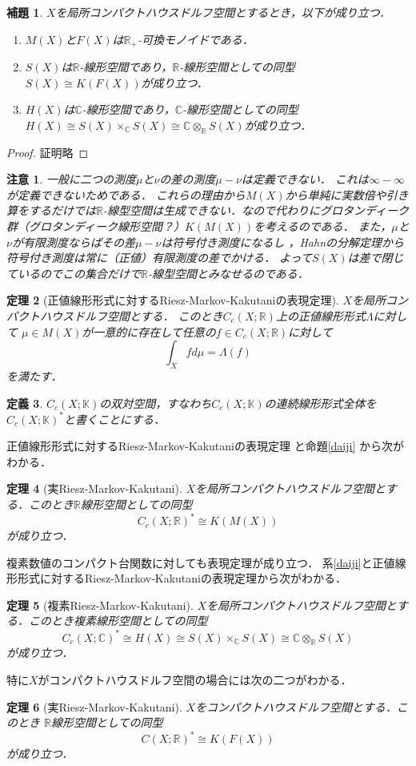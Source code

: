 \documentclass[leqno]{jsarticle}
\newtheorem{thm}{定理}
\newtheorem{lem}[thm]{補題}
\newtheorem{df}[thm]{定義}
\newtheorem*{cau}{注意}
\newcommand{\rr}{\mathbb{R}}
\newcommand{\cc}{\mathbb{C}}
\newcommand{\kk}{\mathbb{K}}
\begin{document}
\begin{lem}
$X$を局所コンパクトハウスドルフ空間とするとき，以下が成り立つ．
\begin{enumerate}
\item $M(X)$と$F(X)$は$\rr_{+}$-可換モノイドである．
\item $S(X)$は$\rr$-線形空間であり，$\rr$-線形空間としての同型$S(X)\cong K(F(X))$が成り立つ．
\item $H(X)$は$\cc$-線形空間であり，$\cc$-線形空間としての同型
$H(X)\cong S(X)\times_{\cc}S(X)\cong \cc\otimes_{\rr}S(X)$が成り立つ．
\end{enumerate}
\end{lem}
\begin{proof}
証明略
\end{proof}

\begin{cau}
一般に二つの測度$\mu$と$\nu$の差の測度$\mu-\nu$は定義できない．
これは$\infty-\infty$が定義できないためである．
これらの理由から$M(X)$から単純に実数倍や引き算をするだけでは$\rr$-線型空間は生成できない．なので代わりにグロタンディーク群（グロタンディーク線形空間？）$K(M(X))$を考えるのである．
また，$\mu$と$\nu$が有限測度ならばその差$\mu-\nu$は符号付き測度になるし
，Hahnの分解定理から符号付き測度は常に（正値）有限測度の差でかける．
よって$S(X)$は差で閉じているのでこの集合だけで$\rr$-線型空間とみなせるのである．
\end{cau}


\begin{thm}[正値線形形式に対するRiesz-Markov-Kakutaniの表現定理]
$X$を局所コンパクトハウスドルフ空間とする．
このとき$C_c(X; \rr)$上の正値線形形式$\Lambda$に対して
$\mu\in M(X)$が一意的に存在して任意の$f\in C_c(X; \rr)$に対して
\[
\int_Xf d\mu=\Lambda(f)
\]
を満たす．
\end{thm}


\begin{df}
$C_c(X; \kk)$の双対空間，すなわち$C_c(X; \kk)$の連続線形形式全体を
$C_c(X; \kk)^*$と書くことにする．
\end{df}

正値線形形式に対するRiesz-Markov-Kakutaniの表現定理
と命題\ref{daiji}
から次がわかる．
\begin{thm}[実Riesz-Markov-Kakutani]
$X$を局所コンパクトハウスドルフ空間とする．このとき$\rr$線形空間としての同型
\[
C_c(X; \rr)^*\cong K(M(X))
\]
が成り立つ．
\end{thm}

複素数値のコンパクト台関数に対しても表現定理が成り立つ．
系\ref{daiji}と正値線形形式に対するRiesz-Markov-Kakutaniの表現定理から次がわかる．
\begin{thm}[複素Riesz-Markov-Kakutani]
$X$を局所コンパクトハウスドルフ空間とする．このとき複素線形空間としての同型
\[
C_c(X; \cc)^*\cong H(X) \cong S(X)\times_{\cc} S(X)\cong \cc\otimes_{\rr}S(X)
\]
が成り立つ．
\end{thm}
特に$X$がコンパクトハウスドルフ空間の場合には次の二つがわかる．
\begin{thm}[実Riesz-Markov-Kakutani]
$X$をコンパクトハウスドルフ空間とする．このとき
$\rr$線形空間としての同型
\[
C(X; \rr)^*\cong K(F(X))
\]
が成り立つ．
\end{thm}
\end{document}
